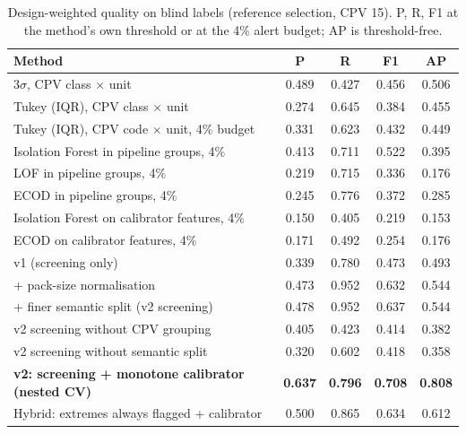 \documentclass[conference]{IEEEtran}
\begin{document}
\begin{table}[t]
\centering
\caption{Design-weighted quality on blind labels (reference selection, CPV 15). P, R, F1 at the method's
own threshold or at the 4\% alert budget; AP is threshold-free.}
\label{tab:labels}
\small
\begin{tabular}{lcccc}
\toprule
Method & P & R & F1 & AP \\
\midrule
3$\sigma$, CPV class $\times$ unit & 0.489 & 0.427 & 0.456 & 0.506 \\
Tukey (IQR), CPV class $\times$ unit & 0.274 & 0.645 & 0.384 & 0.455 \\
Tukey (IQR), CPV code $\times$ unit, 4\% budget & 0.331 & 0.623 & 0.432 & 0.449 \\
Isolation Forest in pipeline groups, 4\% & 0.413 & 0.711 & 0.522 & 0.395 \\
LOF in pipeline groups, 4\% & 0.219 & 0.715 & 0.336 & 0.176 \\
ECOD in pipeline groups, 4\% & 0.245 & 0.776 & 0.372 & 0.285 \\
Isolation Forest on calibrator features, 4\% & 0.150 & 0.405 & 0.219 & 0.153 \\
ECOD on calibrator features, 4\% & 0.171 & 0.492 & 0.254 & 0.176 \\
\midrule
v1 (screening only) & 0.339 & 0.780 & 0.473 & 0.493 \\
\quad + pack-size normalisation & 0.473 & 0.952 & 0.632 & 0.544 \\
\quad + finer semantic split (v2 screening) & 0.478 & 0.952 & 0.637 & 0.544 \\
v2 screening without CPV grouping & 0.405 & 0.423 & 0.414 & 0.382 \\
v2 screening without semantic split & 0.320 & 0.602 & 0.418 & 0.358 \\
\midrule
\textbf{v2: screening + monotone calibrator (nested CV)} & \textbf{0.637} & \textbf{0.796} & \textbf{0.708} & \textbf{0.808} \\
Hybrid: extremes always flagged + calibrator & 0.500 & 0.865 & 0.634 & 0.612 \\
\bottomrule
\end{tabular}
\end{table}
\end{document}
